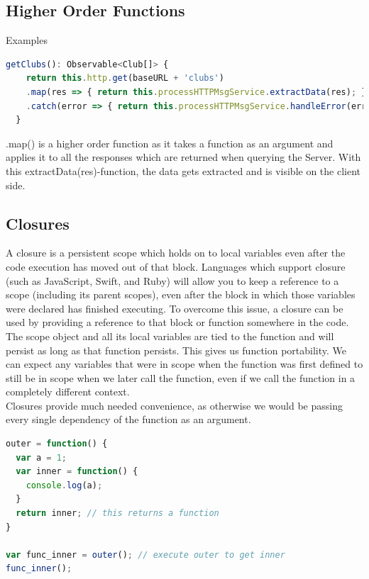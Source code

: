 \documentclass[12pt]{article}
\begin{document}
\subsection{Higher Order Functions}

Examples
\begin{lstlisting}[language=javascript]
getClubs(): Observable<Club[]> {
    return this.http.get(baseURL + 'clubs')
    .map(res => { return this.processHTTPMsgService.extractData(res); })
    .catch(error => { return this.processHTTPMsgService.handleError(error); });
  }
\end{lstlisting}
.map() is a higher order function as it takes a function as an argument and applies it to all the responses which are returned when querying the Server. With this extractData(res)-function, the data gets extracted and is visible on the client side.

\subsection{Closures}

A closure is a persistent scope which holds on to local variables even after the code execution has moved out of that block. Languages which support closure (such as JavaScript, Swift, and Ruby) will allow you to keep a reference to a scope (including its parent scopes), even after the block in which those variables were declared has finished executing. To overcome this issue, a closure can be used by providing a reference to that block or function somewhere in the code.\\
The scope object and all its local variables are tied to the function and will persist as long as that function persists.
This gives us function portability. We can expect any variables that were in scope when the function was first defined to still be in scope when we later call the function, even if we call the function in a completely different context.\\
Closures provide much needed convenience, as otherwise we would be passing every single dependency of the function as an argument.

\begin{lstlisting}[language=javascript]
outer = function() {
  var a = 1;
  var inner = function() {
    console.log(a);
  }
  return inner; // this returns a function
}

var func_inner = outer(); // execute outer to get inner 
func_inner();
\end{lstlisting}
\end{document}

